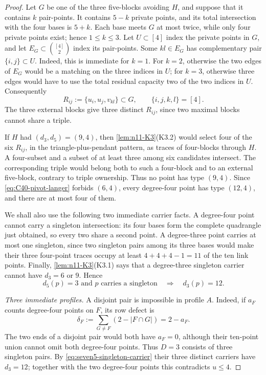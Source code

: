 \begin{proof}
Let \(G\) be one of the three five-blocks avoiding \(H\), and suppose that
it contains \(k\) pair-points.  It contains \(5-k\) private points, and its
total intersection with the four bases is \(5+k\).  Each base meets \(G\)
at most twice, while only four private points exist; hence
\(1\le k\le3\).  Let \(U\subset[4]\) index the private points in \(G\), and
let \(E_G\subset\binom{[4]}2\) index its pair-points.  Some
\(kl\in E_G\) has complementary pair \(\{i,j\}\subset U\).  Indeed, this
is immediate for \(k=1\).  For \(k=2\), otherwise the two edges of \(E_G\)
would be a matching on the three indices in \(U\); for \(k=3\), otherwise
three edges would have to use the total residual capacity two of the two
indices in \(U\).  Consequently
\begin{equation}\label{eq:seven5-external-R}
 R_{ij}:=\{u_i,u_j,v_{kl}\}\subset G,\qquad\{i,j,k,l\}=[4].
\end{equation}
The three external blocks give three distinct \(R_{ij}\), since two
maximal blocks cannot share a triple.

If \(H\) had \((d_3,d_5)=(9,4)\), then
\cref{lem:n11-K3}(K3.2) would select four of the six \(R_{ij}\), in the
triangle-plus-pendant pattern, as traces of four-blocks through \(H\).
A four-subset and a subset of at least three among six candidates intersect.
The corresponding triple would belong both to such a four-block and to an
external five-block, contrary to triple ownership.  Thus no point has type
\((9,4)\).  Since \eqref{eq:C40-pivot-langer} forbids \((6,4)\), every
degree-four point has type \((12,4)\), and there are at most four of them.

We shall also use the following two immediate carrier facts.  A degree-four
point cannot carry a singleton intersection: its four bases form the
complete quadrangle just obtained, so every two share a second point.
A degree-three point carries at most one singleton, since two singleton
pairs among its three bases would make their three four-point traces occupy
at least \(4+4+4-1=11\) of the ten link points.  Finally,
\cref{lem:n11-K3}(K3.1) says that a degree-three singleton carrier cannot
have \(d_3=6\) or \(9\).  Hence
\begin{equation}\label{eq:seven5-singleton-carrier}
 d_5(p)=3\text{ and \(p\) carries a singleton}\quad\Longrightarrow\quad
 d_3(p)=12.
\end{equation}

\smallskip
\noindent\emph{Three immediate profiles.}
A disjoint pair is impossible in profile \(A\).  Indeed, if \(a_F\) counts
degree-four points on \(F\), its row defect is
\[
 \delta_F:=\sum_{G\ne F}(2-|F\cap G|)=2-a_F.
\]
The two ends of a disjoint pair would both have \(a_F=0\), although their
ten-point union cannot omit both degree-four points.  Thus \(D=3\) consists
of three singleton pairs.  By \eqref{eq:seven5-singleton-carrier} their
three distinct carriers have \(d_3=12\); together with the two degree-four
points this contradicts \(u\le4\).


\end{proof}
